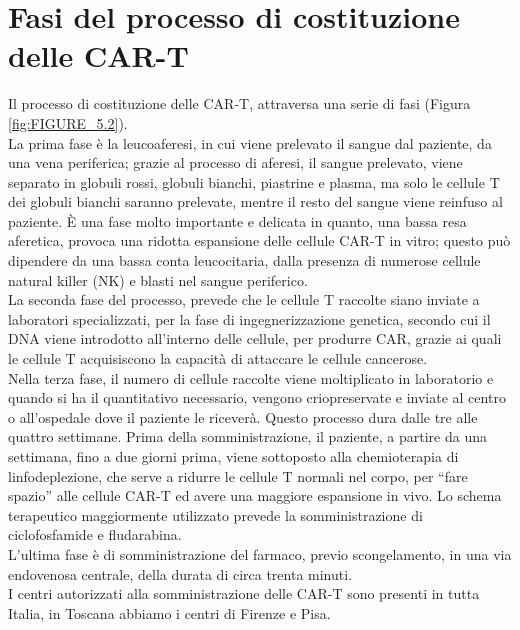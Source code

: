 \section{Fasi del processo di costituzione delle CAR-T}

Il processo di costituzione delle CAR-T, attraversa una serie di fasi (Figura \ref{fig:FIGURE_5.2}).\\
La prima fase è la leucoaferesi, in cui viene prelevato il sangue dal 
paziente, da una vena periferica; grazie al processo di aferesi, il sangue prelevato, viene separato in 
globuli rossi, globuli bianchi, piastrine e plasma, ma solo le cellule T dei globuli bianchi saranno prelevate, 
mentre il resto del sangue viene reinfuso al paziente\cite{LLSCART}.
È una fase molto importante e delicata in quanto, una bassa resa aferetica, provoca una 
ridotta espansione delle cellule CAR-T in vitro; questo può dipendere da una bassa conta leucocitaria, 
dalla presenza di numerose cellule natural killer (NK) e blasti nel sangue periferico\cite{EMATOCART}.\\
La seconda fase del processo, prevede che le cellule T raccolte siano inviate a laboratori specializzati, per la fase 
di ingegnerizzazione genetica, secondo cui il DNA viene introdotto all’interno delle cellule, per produrre CAR, 
grazie ai quali le cellule T acquisiscono la capacità di attaccare le cellule cancerose\cite{EMATOCART}.\\
Nella terza fase, il numero di cellule raccolte viene moltiplicato in laboratorio e quando si ha il quantitativo 
necessario, vengono criopreservate e inviate al centro o all’ospedale dove il paziente le riceverà. 
Questo processo dura dalle tre alle quattro settimane\cite{LLSCART}.
Prima della somministrazione, il paziente, a partire da una settimana, fino a due giorni prima, viene sottoposto 
alla chemioterapia di linfodeplezione, che serve a ridurre le cellule T normali nel corpo, per “fare spazio” alle 
cellule CAR-T ed avere una maggiore espansione in vivo\cite{LLSCART}.
Lo schema terapeutico maggiormente utilizzato prevede la somministrazione di ciclofosfamide e fludarabina.\\
L’ultima fase è di somministrazione del farmaco, previo scongelamento, in una via endovenosa centrale, 
della durata di circa trenta minuti\cite{EMATOCART}.\\
I centri autorizzati alla somministrazione delle CAR-T sono presenti in tutta Italia, in Toscana abbiamo 
i centri di Firenze e Pisa\cite{AILCENTRI}.

